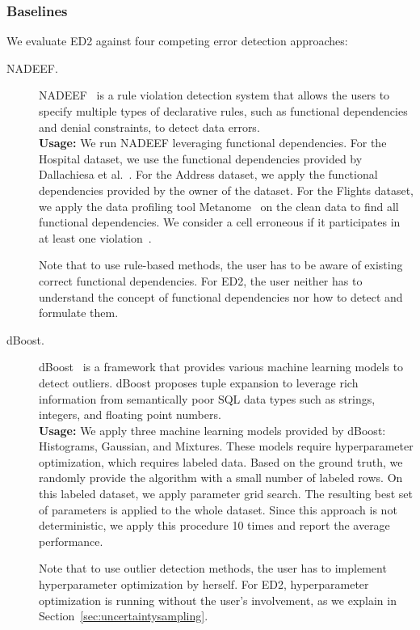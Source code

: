 \subsubsection{Baselines}
We evaluate ED2 against four competing error detection approaches:

\begin{description}
  \item[NADEEF. \label{nadeef_config}] NADEEF~\cite{dallachiesa2013nadeef, khayyat2015bigdansing} is a rule violation detection system  that allows the users to specify multiple types of declarative rules, such as functional dependencies and denial constraints, to detect data errors. \\
  \textbf{Usage:}
  We run NADEEF leveraging functional dependencies. For the Hospital dataset, we use the functional dependencies provided by Dallachiesa et al.~\cite{dallachiesa2013nadeef}. For the Address dataset, we apply the functional dependencies provided by the owner of the dataset. For the Flights dataset, we apply the data profiling tool Metanome~\cite{papenbrock2015metanome} on the clean data to find all functional dependencies. We consider a cell erroneous if it participates in at least one violation~\cite{abedjan2016detecting}.
  
  Note that to use rule-based methods, the user has to be aware of existing correct functional dependencies. For ED2, the user neither has to understand the concept of functional dependencies nor how to detect and formulate them.
  
  
  \item[dBoost.] dBoost~\cite{pit2016outlier} is a framework that provides various machine learning models to detect outliers. 
  dBoost proposes tuple expansion to leverage rich information from semantically poor SQL data types such as strings, integers, and floating point numbers. \\
  \textbf{Usage:}
  We apply three machine learning models provided by dBoost: Histograms, Gaussian, and Mixtures. These models require hyperparameter optimization, which requires labeled data. Based on the ground truth, we randomly provide the algorithm with a small number of labeled rows. On this labeled dataset, we apply parameter grid search. The resulting best set of parameters is applied to the whole dataset. Since this approach is not deterministic, we apply this procedure 10 times and report the average performance.
  
  Note that to use outlier detection methods, the user has to implement hyperparameter optimization by herself. For ED2, hyperparameter optimization is running without the user's involvement, as we explain in Section~\ref{sec:uncertaintysampling}.
  

\end{description}
